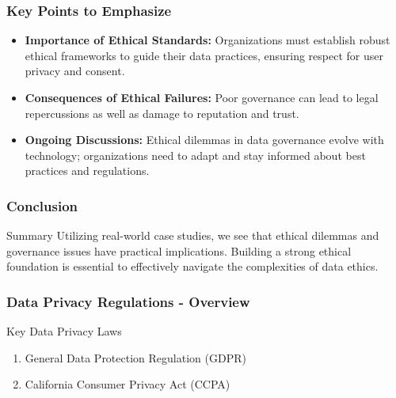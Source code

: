 \documentclass[aspectratio=169]{beamer}
\begin{document}
\begin{frame}[fragile]
  \frametitle{Key Points to Emphasize}
  \begin{itemize}
    \item \textbf{Importance of Ethical Standards:} Organizations must establish robust ethical frameworks to guide their data practices, ensuring respect for user privacy and consent.
    
    \item \textbf{Consequences of Ethical Failures:} Poor governance can lead to legal repercussions as well as damage to reputation and trust.
    
    \item \textbf{Ongoing Discussions:} Ethical dilemmas in data governance evolve with technology; organizations need to adapt and stay informed about best practices and regulations.
  \end{itemize}
\end{frame}

\begin{frame}[fragile]
  \frametitle{Conclusion}
  \begin{block}{Summary}
    Utilizing real-world case studies, we see that ethical dilemmas and governance issues have practical implications. Building a strong ethical foundation is essential to effectively navigate the complexities of data ethics.
  \end{block}
\end{frame}

\begin{frame}[fragile]
    \frametitle{Data Privacy Regulations - Overview}
    \begin{block}{Key Data Privacy Laws}
        \begin{enumerate}
            \item General Data Protection Regulation (GDPR)
            \item California Consumer Privacy Act (CCPA)
        \end{enumerate}
    \end{block}
\end{frame}
\end{document}
